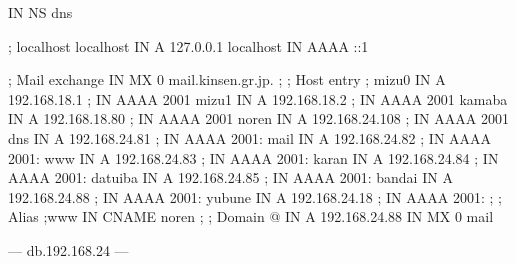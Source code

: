 \documentclass[mingoth,a4paper]{jsarticle}
\begin{document}
{{{{{{{\begin{itemize}
\begin{commandline}
		IN      NS      dns

; localhost
localhost       IN      A       127.0.0.1
localhost       IN      AAAA    ::1

; Mail exchange
                IN      MX      0 mail.kinsen.gr.jp.
;
; Host entry
;
mizu0           IN      A       192.168.18.1
;               IN      AAAA    2001
mizu1           IN      A       192.168.18.2
;               IN      AAAA    2001
kamaba          IN      A       192.168.18.80
;               IN      AAAA    2001
noren           IN      A       192.168.24.108
;               IN      AAAA    2001
dns             IN      A       192.168.24.81
;               IN      AAAA    2001:
mail            IN      A       192.168.24.82
;               IN      AAAA    2001:
www             IN      A       192.168.24.83
;               IN      AAAA    2001:
karan           IN      A       192.168.24.84
;               IN      AAAA    2001:
datuiba         IN      A       192.168.24.85
;               IN      AAAA    2001:
bandai          IN      A       192.168.24.88
;               IN      AAAA    2001:
yubune          IN      A       192.168.24.18
;               IN      AAAA    2001:
;
; Alias
;www            IN      CNAME    noren
;
; Domain
@               IN      A       192.168.24.88
                IN      MX 0    mail
\end{commandline}
--- db.192.168.24 ---
\clearpage


\end{itemize}}}}}}}}
\end{document}
